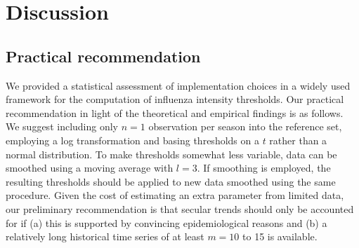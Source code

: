 \documentclass[12pt]{article}
\begin{document}

\section{Discussion}
\label{sec:discussion}

\subsection{Practical recommendation}

We provided a statistical assessment of implementation choices in a widely used framework for the computation of influenza intensity thresholds. Our practical recommendation in light of the theoretical and empirical findings is as follows. We suggest including only $n = 1$ observation per season into the reference set, employing a log transformation and basing thresholds on a $t$ rather than a normal distribution. To make thresholds somewhat less variable, data can be smoothed using a moving average with $l = 3$. If smoothing is employed, the resulting thresholds should be applied to new data smoothed using the same procedure. Given the cost of estimating an extra parameter from limited data, our preliminary recommendation is that secular trends should only be accounted for if (a) this is supported by convincing epidemiological reasons and (b) a relatively long historical time series of at least $m = 10$ to 15 is available. %
\end{document}
